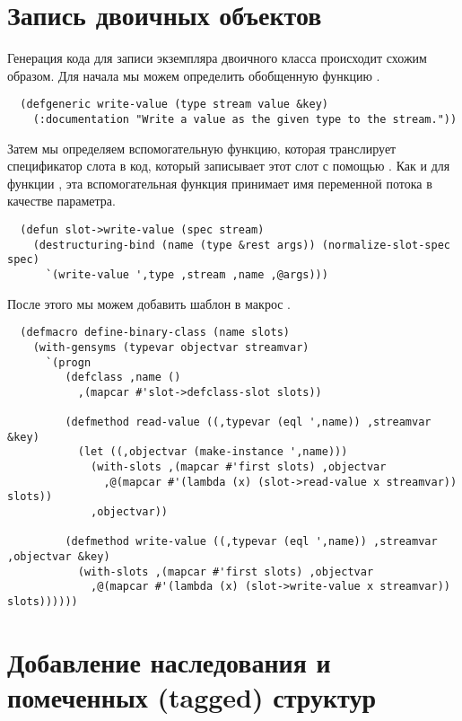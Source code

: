 \section{Запись двоичных объектов}

Генерация кода для записи экземпляра двоичного класса происходит схожим образом. Для
начала мы можем определить обобщенную функцию .

\begin{lstlisting}
  (defgeneric write-value (type stream value &key)
    (:documentation "Write a value as the given type to the stream."))
\end{lstlisting}

Затем мы определяем вспомогательную функцию, которая транслирует спецификатор слота
 в код, который записывает этот слот с помощью
. Как и для функции , эта вспомогательная функция
принимает имя переменной потока в качестве параметра.

\begin{lstlisting}
  (defun slot->write-value (spec stream)
    (destructuring-bind (name (type &rest args)) (normalize-slot-spec spec)
      `(write-value ',type ,stream ,name ,@args)))
\end{lstlisting}

После этого мы можем добавить шаблон  в макрос
.

\begin{lstlisting}
  (defmacro define-binary-class (name slots)
    (with-gensyms (typevar objectvar streamvar)
      `(progn
         (defclass ,name ()
           ,(mapcar #'slot->defclass-slot slots))

         (defmethod read-value ((,typevar (eql ',name)) ,streamvar &key)
           (let ((,objectvar (make-instance ',name)))
             (with-slots ,(mapcar #'first slots) ,objectvar
               ,@(mapcar #'(lambda (x) (slot->read-value x streamvar)) slots))
             ,objectvar))

         (defmethod write-value ((,typevar (eql ',name)) ,streamvar ,objectvar &key)
           (with-slots ,(mapcar #'first slots) ,objectvar
             ,@(mapcar #'(lambda (x) (slot->write-value x streamvar)) slots))))))
\end{lstlisting}

\section{Добавление наследования и помеченных (tagged) структур}

